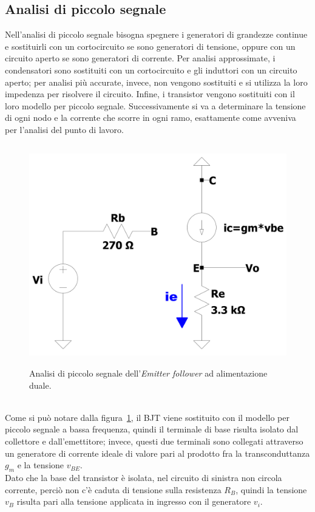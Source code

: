 \documentclass{report}
\begin{document}
\subsection{Analisi di piccolo segnale} \label{piccolosegnaleEFv1}
Nell'analisi di piccolo segnale bisogna spegnere i generatori di grandezze continue e sostituirli con un cortocircuito se sono generatori di tensione, oppure con un circuito aperto se sono generatori di corrente. Per analisi approssimate, i condensatori sono sostituiti con un cortocircuito e gli induttori con un circuito aperto; per analisi più accurate, invece, non vengono sostituiti e si utilizza la loro impedenza per risolvere il circuito. Infine, i transistor vengono sostituiti con il loro modello per piccolo segnale. Successivamente si va a determinare la tensione di ogni nodo e la corrente che scorre in ogni ramo, esattamente come avveniva per l'analisi del punto di lavoro. 
\begin{figure}[h]
\centering
\includegraphics[height=9.6cm]{immagini/EFv1_ps}
\caption{Analisi di piccolo segnale dell'\textit{Emitter follower} ad alimentazione duale.}
\label{figura:EFv1_ps}
\end{figure}
\\Come si può notare dalla figura~\ref{figura:EFv1_ps}, il BJT viene sostituito con il modello per piccolo segnale a bassa frequenza, quindi il terminale di base risulta isolato dal collettore e dall'emettitore; invece, questi due terminali sono collegati attraverso un generatore di corrente ideale di valore pari al prodotto fra la transconduttanza $g_m$ e la tensione $v_{BE}$.
\\Dato che la base del transistor è isolata, nel circuito di sinistra non circola corrente, perciò non c'è caduta di tensione sulla resistenza $R_B$, quindi la tensione $v_B$ risulta pari alla tensione applicata in ingresso con il generatore $v_i$.
\end{document}
